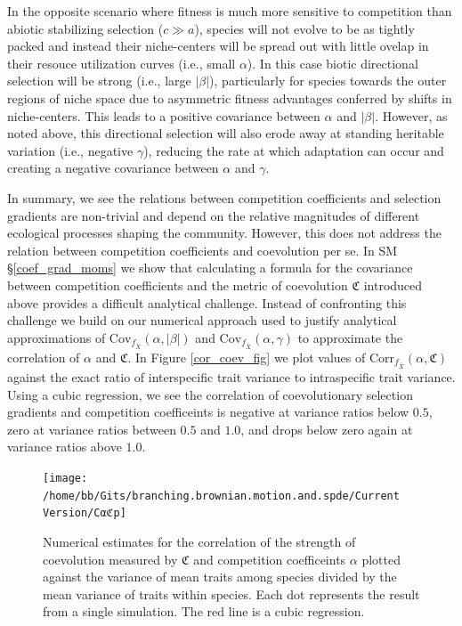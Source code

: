 \documentclass[]{elsarticle} %
\begin{document}
In the opposite scenario where fitness is much more sensitive to
competition than abiotic stabilizing selection (\(c\gg a\)), species
will not evolve to be as tightly packed and instead their niche-centers
will be spread out with little ovelap in their resouce utilization
curves (i.e., small \(\alpha\)). In this case biotic directional
selection will be strong (i.e., large \(|\beta|\)), particularly for
species towards the outer regions of niche space due to asymmetric
fitness advantages conferred by shifts in niche-centers. This leads to a
positive covariance between \(\alpha\) and \(|\beta|\). However, as
noted above, this directional selection will also erode away at standing
heritable variation (i.e., negative \(\gamma\)), reducing the rate at
which adaptation can occur and creating a negative covariance between
\(\alpha\) and \(\gamma\).

In summary, we see the relations between competition coefficients and
selection gradients are non-trivial and depend on the relative
magnitudes of different ecological processes shaping the community.
However, this does not address the relation between competition
coefficients and coevolution per se. In SM \S\ref{coef_grad_moms} we
show that calculating a formula for the covariance between competition
coefficients and the metric of coevolution \(\mathfrak{C}\) introduced
above provides a difficult analytical challenge. Instead of confronting
this challenge we build on our numerical approach used to justify
analytical approximations of
\(\mathrm{Cov}_{f_{\bar X}}(\alpha,|\beta|)\) and
\(\mathrm{Cov}_{f_{\bar X}}(\alpha,\gamma)\) to approximate the
correlation of \(\alpha\) and \(\mathfrak{C}\). In Figure
\ref{cor_coev_fig} we plot values of
\(\mathrm{Corr}_{f_{\bar X}}(\alpha,\mathfrak{C})\) against the exact
ratio of interspecific trait variance to intraspecific trait variance.
Using a cubic regression, we see the correlation of coevolutionary
selection gradients and competition coefficeints is negative at variance
ratios below \(0.5\), zero at variance ratios between \(0.5\) and
\(1.0\), and drops below zero again at variance ratios above \(1.0\).

\begin{figure}

{\centering \texttt{[image: /home/bb/Gits/branching.brownian.motion.and.spde/Current Version/Cαℭp]} 

}

\caption{\label{cor_coev_fig}Numerical estimates for the correlation of the strength of coevolution measured by $\mathfrak{C}$ and competition coefficeints $\alpha$ plotted against the variance of mean traits among species divided by the mean variance of traits within species. Each dot represents the result from a single simulation. The red line is a cubic regression.}\label{fig:unnamed-chunk-12}
\end{figure}
\end{document}
